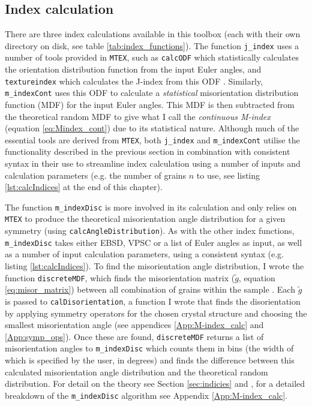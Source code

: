 \documentclass[a4paper,12pt,twoside]{report}
\numberwithin{equation}{chapter}
\begin{document}
\subsection{Index calculation} \label{sec:index_calc}

There are three index calculations available in this toolbox (each with their own directory on disk, see table \ref{tab:index_functions}). The function \texttt{j\_{}index} uses a number of tools provided in \texttt{MTEX},  such as \texttt{calcODF} which statistically calculates the orientation distribution function from the input Euler angles, and \texttt{textureindex} which calculates the J-index from this ODF \citep[for details on their method of ODF calculation see][]{Hielscher2008}. Similarly, \texttt{m\_{}indexCont} uses this ODF to calculate a \emph{statistical} misorientation distribution function (MDF) for the input Euler angles.  This MDF is then subtracted from the theoretical random MDF to give what I call the \emph{continuous M-index} (equation \ref{eq:Mindex_cont}) due to its statistical nature.  Although much of the essential tools are derived from \texttt{MTEX}, both \texttt{j\_{}index} and \texttt{m\_{}indexCont} utilise the functionality described in the previous section in combination with consistent syntax in their use to streamline index calculation using a number of inputs and calculation parameters (e.g. the number of grains $n$ to use, see listing \ref{lst:calcIndices} at the end of this chapter).         

The function \texttt{m\_{}indexDisc} is more involved in its calculation and only relies on \texttt{MTEX} to produce the theoretical misorientation angle distribution for a given symmetry (using \texttt{calcAngleDistribution}). As with the other index functions, \texttt{m\_{}indexDisc} takes either EBSD, VPSC or a list of Euler angles as input, as well as a number of input calculation parameters, using a consistent syntax (e.g. listing \ref{lst:calcIndices}). To find the misorientation angle distribution, I wrote the function \texttt{discreteMDF}, which finds the misorientation matrix ($\tilde{g}$, equation \ref{eq:misor_matrix}) between all combination of grains within the sample \citep[uncorrelated misorientation angle distribution,][]{Mainprice}. Each $\tilde{g}$ is passed to \texttt{calDisorientation}, a function I wrote that finds the disorientation \citep{Grimmer1979} by applying symmetry operators for the chosen crystal structure and choosing the smallest misorientation angle (see appendices \ref{App:M-index_calc} and \ref{App:symp_ops}). Once these are found, \texttt{discreteMDF} returns a list of misorientation angles to \texttt{m\_{}indexDisc} which counts them in bins (the width of which is specified by the user, in degrees) and finds the difference between this calculated misorientation angle distribution and the theoretical random distribution. For detail on the theory see Section \ref{sec:indicies} and \cite{Skemer}, for a detailed breakdown of the \texttt{m\_{}indexDisc} algorithm see Appendix \ref{App:M-index_calc}.                                            
\end{document}

